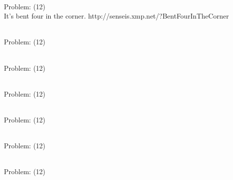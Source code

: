 \documentclass[11pt]{article}
\begin{document}
\begin{minipage}[t]{0.5\textwidth}
  {\centering
  
\\
Problem: (12)\\
It's bent four in the corner. http://senseis.xmp.net/?BentFourInTheCorner\\
  }
\end{minipage}
\begin{minipage}[t]{0.5\textwidth}
  {\centering
  
\\
Problem: (12)\\
  }
\end{minipage}
\begin{minipage}[t]{0.5\textwidth}
  {\centering
  
\\
Problem: (12)\\
  }
\end{minipage}
\begin{minipage}[t]{0.5\textwidth}
  {\centering
  
\\
Problem: (12)\\
  }
\end{minipage}
\begin{minipage}[t]{0.5\textwidth}
  {\centering
  
\\
Problem: (12)\\
  }
\end{minipage}
\begin{minipage}[t]{0.5\textwidth}
  {\centering
  
\\
Problem: (12)\\
  }
\end{minipage}
\begin{minipage}[t]{0.5\textwidth}
  {\centering
  
\\
Problem: (12)\\
  }
\end{minipage}
\end{document}
